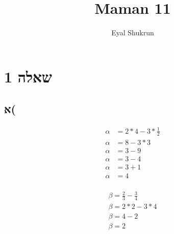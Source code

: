 \documentclass{article}
\title{Maman 11}
\author{Eyal Shukrun}
\begin{document}
\maketitle

\section{שאלה 1}
\subsection{א(}
\begin{align*}
  \alpha &= 2*4 - 3*\frac{1}{2}\\
  \alpha &= 8 - 3*3\\
  \alpha &= 3 - 9\\
  \alpha &= 3 - 4\\
  \alpha &= 3 + 1\\
  \alpha &= 4\\
\end{align*} 

\begin{align*}
  \beta = \frac{2}{3} - \frac{3}{4}\\
  \beta = 2*2 - 3*4\\
  \beta = 4 - 2\\
  \beta = 2\\
\end{align*}
\end{document}
